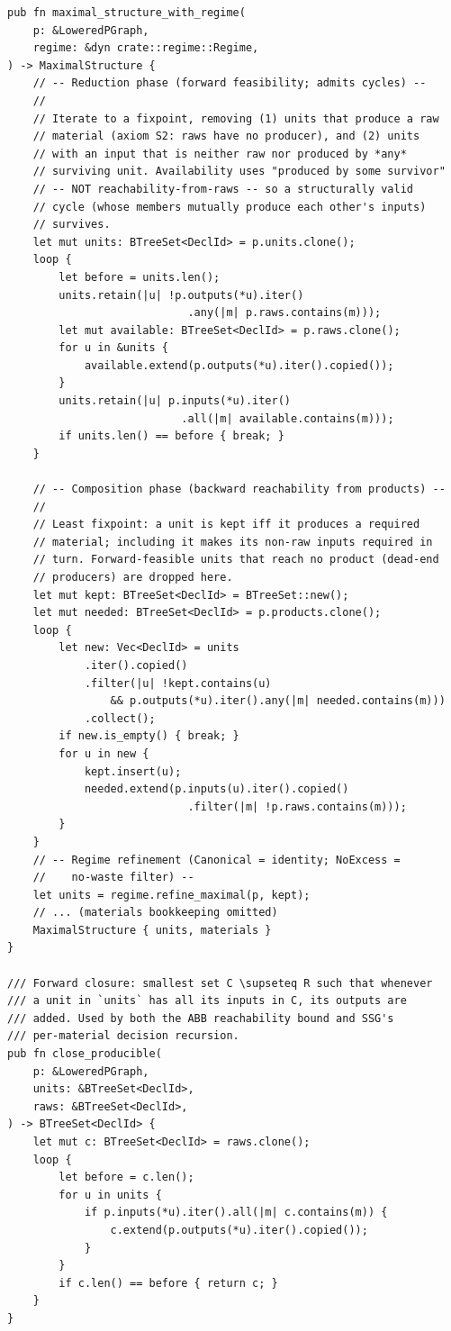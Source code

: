 \documentclass[11pt]{article}
\begin{document}
\begin{lstlisting}[style=ruststyle]
pub fn maximal_structure_with_regime(
    p: &LoweredPGraph,
    regime: &dyn crate::regime::Regime,
) -> MaximalStructure {
    // -- Reduction phase (forward feasibility; admits cycles) --
    //
    // Iterate to a fixpoint, removing (1) units that produce a raw
    // material (axiom S2: raws have no producer), and (2) units
    // with an input that is neither raw nor produced by *any*
    // surviving unit. Availability uses "produced by some survivor"
    // -- NOT reachability-from-raws -- so a structurally valid
    // cycle (whose members mutually produce each other's inputs)
    // survives.
    let mut units: BTreeSet<DeclId> = p.units.clone();
    loop {
        let before = units.len();
        units.retain(|u| !p.outputs(*u).iter()
                            .any(|m| p.raws.contains(m)));
        let mut available: BTreeSet<DeclId> = p.raws.clone();
        for u in &units {
            available.extend(p.outputs(*u).iter().copied());
        }
        units.retain(|u| p.inputs(*u).iter()
                           .all(|m| available.contains(m)));
        if units.len() == before { break; }
    }

    // -- Composition phase (backward reachability from products) --
    //
    // Least fixpoint: a unit is kept iff it produces a required
    // material; including it makes its non-raw inputs required in
    // turn. Forward-feasible units that reach no product (dead-end
    // producers) are dropped here.
    let mut kept: BTreeSet<DeclId> = BTreeSet::new();
    let mut needed: BTreeSet<DeclId> = p.products.clone();
    loop {
        let new: Vec<DeclId> = units
            .iter().copied()
            .filter(|u| !kept.contains(u)
                && p.outputs(*u).iter().any(|m| needed.contains(m)))
            .collect();
        if new.is_empty() { break; }
        for u in new {
            kept.insert(u);
            needed.extend(p.inputs(u).iter().copied()
                            .filter(|m| !p.raws.contains(m)));
        }
    }
    // -- Regime refinement (Canonical = identity; NoExcess =
    //    no-waste filter) --
    let units = regime.refine_maximal(p, kept);
    // ... (materials bookkeeping omitted)
    MaximalStructure { units, materials }
}

/// Forward closure: smallest set C \supseteq R such that whenever
/// a unit in `units` has all its inputs in C, its outputs are
/// added. Used by both the ABB reachability bound and SSG's
/// per-material decision recursion.
pub fn close_producible(
    p: &LoweredPGraph,
    units: &BTreeSet<DeclId>,
    raws: &BTreeSet<DeclId>,
) -> BTreeSet<DeclId> {
    let mut c: BTreeSet<DeclId> = raws.clone();
    loop {
        let before = c.len();
        for u in units {
            if p.inputs(*u).iter().all(|m| c.contains(m)) {
                c.extend(p.outputs(*u).iter().copied());
            }
        }
        if c.len() == before { return c; }
    }
}
\end{lstlisting}
\end{document}
